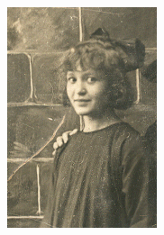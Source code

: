 \documentclass[12pt,twoside, openright]{memoir}
\begin{document}
\begin{figure}
\centering
\includegraphics[width=\textwidth]{img/JongeLena}
\caption*{\footnotesize }
\end{figure}
\end{document}

